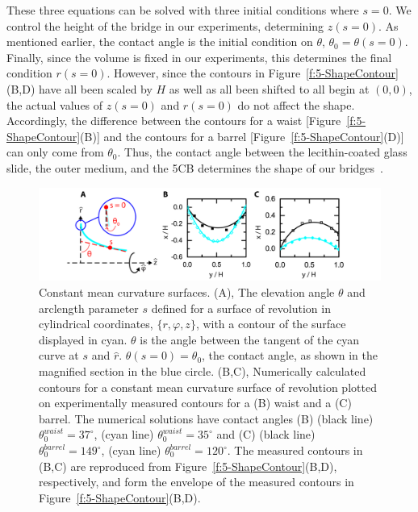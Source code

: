 These three equations can be solved with three initial conditions where $s = 0$.
We control the height of the bridge in our experiments, determining $z(s = 0)$.
As mentioned earlier, the contact angle is the initial condition on $\theta$, $\theta_0 = \theta(s=0)$.
Finally, since the volume is fixed in our experiments, this determines the final condition $r(s=0)$.
However, since the contours in Figure~\ref{f:5-ShapeContour}(B,D) have all been scaled by $H$ as well as all been shifted to all begin at $(0,0)$, the actual values of $z(s = 0)$ and $r(s = 0)$ do not affect the shape.
Accordingly, the difference between the contours for a waist [Figure~\ref{f:5-ShapeContour}(B)] and the contours for a barrel [Figure~\ref{f:5-ShapeContour}(D)] can only come from $\theta_0$.
Thus, the contact angle between the lecithin-coated glass slide, the outer medium, and the 5CB determines the shape of our bridges~\cite{RN178}.
\begin{figure}
  \centering
  \includegraphics{figures/C5/Ch5-Figs_ShapeEnvelope.png}
  \caption{Constant mean curvature surfaces.
  (A), The elevation angle $\theta$ and arclength parameter $s$ defined for a surface of revolution in cylindrical coordinates, $\{r,\varphi, z\}$, with a contour of the surface displayed in cyan.
  $\theta$ is the angle between the tangent of the cyan curve at $s$ and $\hat{r}$.
  $\theta(s=0) = \theta_0$, the contact angle, as shown in the magnified section in the blue circle.
  (B,C), Numerically calculated contours for a constant mean curvature surface of revolution plotted on experimentally measured contours for a (B) waist and a (C) barrel.
  The numerical solutions have contact angles (B) (black line) $\theta_0^{waist} = 37^{\circ}$, (cyan line) $\theta_0^{waist} = 35^{\circ}$ and (C) (black line) $\theta_0^{barrel} = 149^{\circ}$, (cyan line) $\theta_0^{barrel} = 120^{\circ}$.
  The measured contours in (B,C) are reproduced from Figure~\ref{f:5-ShapeContour}(B,D), respectively, and form the envelope of the measured contours in Figure~\ref{f:5-ShapeContour}(B,D).}\label{f:5-ShapeEnvelope}
\end{figure}

